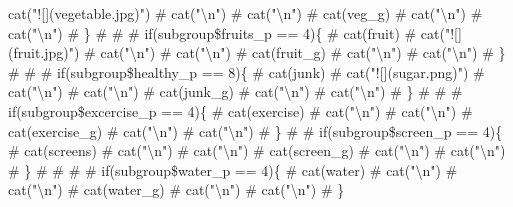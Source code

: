 \documentclass[]{article}
\begin{document}
cat("!{[}{]}(vegetable.jpg)") \#   cat("\textbackslash{}n") \#   cat("\textbackslash{}n") \#   cat(veg\_g) \#   cat("\textbackslash{}n") \#   cat("\textbackslash{}n") \# \} \#  \#  \# if(subgroup\$fruits\_p == 4)\{ \#   cat(fruit) \#   cat("!{[}{]}(fruit.jpg)") \#   cat("\textbackslash{}n") \#   cat("\textbackslash{}n") \#   cat(fruit\_g) \#   cat("\textbackslash{}n") \#   cat("\textbackslash{}n") \# \} \#  \#  \# if(subgroup\$healthy\_p == 8)\{ \#   cat(junk) \#   cat("!{[}{]}(sugar.png)") \#   cat("\textbackslash{}n") \#   cat("\textbackslash{}n") \#   cat(junk\_g) \#   cat("\textbackslash{}n") \#   cat("\textbackslash{}n") \# \} \#  \#  \# if(subgroup\$excercise\_p == 4)\{ \#   cat(exercise) \#   cat("\textbackslash{}n") \#   cat("\textbackslash{}n") \#   cat(exercise\_g) \#   cat("\textbackslash{}n") \#   cat("\textbackslash{}n") \# \} \#  \# if(subgroup\$screen\_p == 4)\{ \#   cat(screens) \#   cat("\textbackslash{}n") \#   cat("\textbackslash{}n") \#   cat(screen\_g) \#   cat("\textbackslash{}n") \#   cat("\textbackslash{}n") \# \} \#  \#  \#  \# if(subgroup\$water\_p == 4)\{ \#   cat(water) \#   cat("\textbackslash{}n") \#   cat("\textbackslash{}n") \#   cat(water\_g) \#   cat("\textbackslash{}n") \#   cat("\textbackslash{}n") \# \} 
\end{document}
